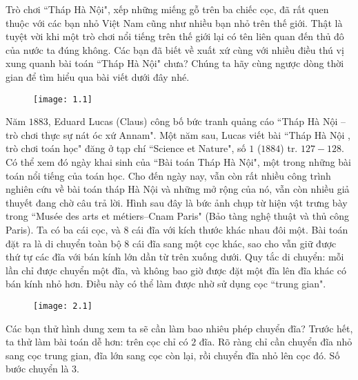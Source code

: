 \begin{multicols}{2}
	Trò chơi ``Tháp Hà Nội", xếp những miếng gỗ trên ba chiếc cọc, đã rất quen thuộc với các bạn nhỏ Việt Nam cũng như nhiều bạn nhỏ trên thế giới. Thật là tuyệt vời khi một trò chơi nổi tiếng trên thế giới lại có tên liên quan đến thủ đô của nước ta đúng không. Các bạn đã biết về xuất xứ cùng với nhiều điều thú vị xung quanh bài toán ``Tháp Hà Nội" chưa? Chúng ta hãy cùng ngược dòng thời gian để tìm hiểu qua bài viết dưới đây nhé.
	\begin{figure}[H]
		\centering
		\vspace*{-5pt}
		\captionsetup{labelformat= empty, justification=centering}
		\texttt{[image: 1.1]}
		\vspace*{-15pt}
	\end{figure}
	Năm $1883$, Eduard Lucas (Claus) công bố  bức tranh quảng cáo ``Tháp Hà Nội --  trò chơi thực sự nát óc xứ Annam".
	\vskip 0.1cm
	Một năm sau, Lucas viết bài ``Tháp Hà Nội , trò chơi toán học" đăng ở tạp chí ``Science et Nature", số $1$ ($1884$) tr. $127-128$. Có thể xem đó ngày khai sinh của ``Bài toán Tháp Hà Nội", một trong những bài toán nổi tiếng của toán học. Cho đến ngày nay, vẫn còn rất nhiều công trình nghiên cứu về bài toán tháp Hà Nội và những mở rộng của nó, vẫn còn nhiều giả thuyết đang chờ câu trả lời.
	\vskip 0.1cm
	Hình sau đây là bức ảnh chụp từ hiện vật trưng bày trong ``Musée des arts et métiers--Cnam Paris" (Bảo tàng nghệ thuật và thủ công Paris). 
	\vskip 0.1cm
	Ta có ba cái cọc, và  $8$ cái đĩa với kích thước khác nhau đôi một. Bài toán đặt ra là di chuyển toàn bộ $8$ cái đĩa sang một cọc khác, sao cho vẫn giữ được thứ tự các đĩa với bán kính lớn dần từ trên xuống dưới. Quy tắc di chuyển: mỗi lần chỉ được chuyển một đĩa, và không bao giờ được đặt một đĩa lên đĩa khác có bán kính nhỏ hơn. Điều này có thể làm được nhờ sử dụng cọc ``trung gian".
	\begin{figure}[H]
		\centering
		\vspace*{5pt}
		\captionsetup{labelformat= empty, justification=centering}
		\texttt{[image: 2.1]}
		\vspace*{-15pt} 
	\end{figure}
	Các bạn thử hình dung xem ta sẽ cần làm bao nhiêu phép chuyển đĩa?
	\vskip 0.1cm
	Trước hết, ta thử làm bài toán dễ hơn: trên cọc chỉ có $2$ đĩa. Rõ ràng chỉ cần chuyển đĩa nhỏ sang cọc trung gian, đĩa lớn sang cọc còn lại, rồi chuyển đĩa nhỏ lên cọc đó. Số bước chuyển là $3$.

\end{multicols}
